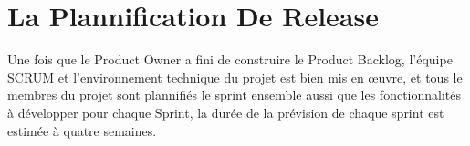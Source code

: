 \section{La Plannification De Release}
\noindent
Une fois que le Product Owner a fini de construire le Product Backlog, l'équipe SCRUM et l'environnement technique du projet est bien mis en œuvre, et tous le membres du projet sont plannifiés le sprint ensemble aussi que les fonctionnalités à développer pour chaque Sprint, la durée de la prévision de chaque sprint est estimée à quatre semaines.